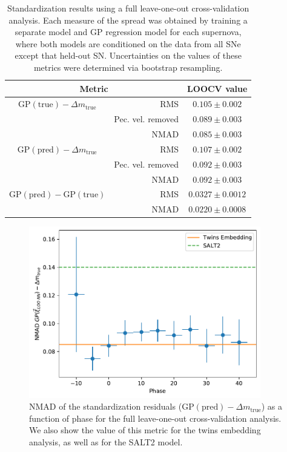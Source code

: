 \begin{table}[htbp]
    \centering
    \begin{tabular}{crc}\toprule
        \multicolumn{2}{c}{Metric} & LOOCV value \\\midrule
        $\textrm{GP}(\textrm{true}) - \Delta m_\textrm{true}$ & RMS & $0.105 \pm 0.002$ \\
        & Pec. vel. removed & $0.089 \pm 0.003$\\
        & NMAD & $0.085 \pm 0.003$ \\
        $\textrm{GP}(\textrm{pred}) - \Delta m_\textrm{true}$ & RMS & $0.107 \pm 0.002$ \\
        & Pec. vel. removed & $0.092 \pm 0.003$ \\
        & NMAD & $0.092 \pm 0.003$\\
        $\textrm{GP}(\textrm{pred}) - \textrm{GP}(\textrm{true})$ & RMS & $0.0327\pm 0.0012$\\
        & NMAD & $0.0220 \pm 0.0008$\\
    \bottomrule
    \end{tabular}
    \caption{Standardization results using a full leave-one-out cross-validation analysis. Each measure of the spread was obtained by training a separate \stoe{} model and GP regression model for each supernova, where both models are conditioned on the data from all SNe except that held-out SN. Uncertainties on the values of these metrics were determined via bootstrap resampling.}
    \label{tab:standardization_loo_results}
\end{table}

\begin{figure}
    \centering
    \includegraphics[width=0.9\textwidth]{figures/nn_twins/stand_err_vs_phase_loo.pdf}
    \caption{NMAD of the standardization residuals ($\textrm{GP}(\textrm{pred}) - \Delta m_\textrm{true}$) as a function of phase for the full leave-one-out cross-validation analysis. We also show the value of this metric for the twins embedding analysis, as well as for the SALT2 model.}
    \label{fig:stand_err_vs_phase_loo}
\end{figure}

